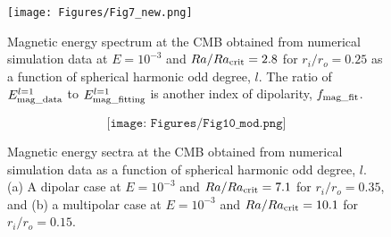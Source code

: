 \begin{figure}
\begin{center}

\texttt{[image: Figures/Fig7\_new.png]}

\end{center}
\caption{
Magnetic energy spectrum at the CMB obtained from numerical simulation data at $E = 10^{-3}$ and $Ra / Ra_{\rm crit} = 2.8$ for $r_i / r_o = 0.25$ as a function of spherical harmonic odd degree, $l$.
The ratio of $E_{\rm mag\_data}^{l=1}$ to $E_{\rm mag\_fitting}^{l=1}$ is another index of dipolarity, $f_{\rm mag\_fit}$.
}
\label{fig:mag_fit_example}
\end{figure}



\begin{figure}
\begin{center}
\[
\texttt{[image: Figures/Fig10\_mod.png]}
\]
\end{center}
\caption{
Magnetic energy sectra at the CMB obtained from numerical simulation data as a function of spherical harmonic odd degree, $l$.
(a) A dipolar case at $E = 10^{-3}$ and $Ra / Ra_{\rm crit} = 7.1$ for $r_{i} / r_{o} = 0.35$, and (b) a multipolar case at $E = 10^{-3}$ and $Ra / Ra_{\rm crit} = 10.1$ for $r_{i} / r_{o} = 0.15$.
}
\label{fig:mag_fitting}
\end{figure}
